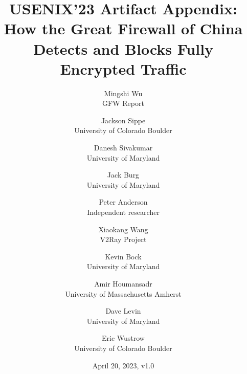 \ifpdf
{}
\pdftrailerid{}
\fi

%
%
%
%
\usepackage[available,functional,reproduced]{usenixbadges}





\date{April 20, 2023, v1.0}

\title{USENIX'23 Artifact Appendix: How the Great Firewall of China \\Detects and Blocks Fully Encrypted Traffic}

\author{
    {\rm Mingshi Wu}\\
    GFW Report
    \and
    {\rm Jackson Sippe}\\
    University of Colorado Boulder
    \and
    {\rm Danesh Sivakumar}\\
    University of Maryland
    \and
    {\rm Jack Burg}\\
    University of Maryland
    \and
    {\rm Peter Anderson}\\
    Independent researcher
    \and
    {\rm Xiaokang Wang}\\
    V2Ray Project
    \and
    {\rm Kevin Bock}\\
    University of Maryland
    \and
    {\rm Amir Houmansadr}\\
    University of Massachusetts Amherst
    \and
    {\rm Dave Levin}\\
    University of Maryland
    \and
    {\rm Eric Wustrow}\\
    University of Colorado Boulder
}

\maketitle





